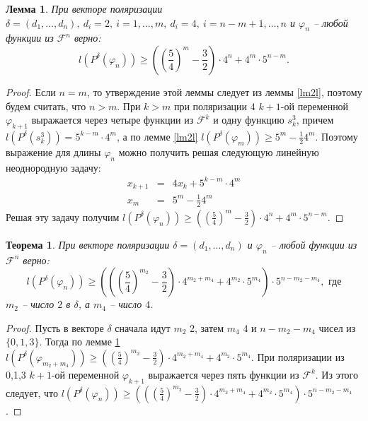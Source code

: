 \documentclass[bibliography=totoc, a4paper, 14pt]{extarticle}
\newtheorem{myth}{Теорема}
\newtheorem{mylm}{Лемма}
\newtheorem*{myco}{Следствие}
\newcommand{\pphi}[1] {P^{\delta}(\varphi_{#1})}
\begin{document}
\begin{mylm}
\label{lm24l}
При векторе поляризации $\delta=(d_1,\dots,d_n),\ d_i = 2,\ i=1,\dots,m,\ d_i=4,{\ i=n-m+1,\dots,n}$
и $\varphi_n$ -- любой функции из $\mathcal{F}^n$ верно:
$$l(\pphi{n})\geqslant\left(\left(\frac{5}{4}\right)^m-\frac{3}{2}\right)\cdot4^n+4^m\cdot5^{n-m}.$$
\end{mylm}
\begin{proof}
Если $n=m$, то утверждение этой леммы следует из леммы \ref{lm2l}, поэтому будем считать, что $n>m$.
При $k > m$ при поляризации 4 $k+1$-ой переменной $\varphi_{k+1}$ выражается через четыре функции
из $\mathcal{F}^k$ и одну функцию $s^3_k$, причем $l(P^{\delta}(s^3_k)) = 5^{k-m} \cdot 4^m$, а по
лемме \ref{lm2l} $l(\pphi{m}) \geqslant 5^m - \frac{1}{2}4^m$. Поэтому выражение для длины
$\varphi_n$ можно получить решая следующую линейную неоднородную задачу:
$$ \begin{array}{lcl}
x_{k+1} &=& 4 x_k + 5^{k-m}\cdot 4^m \\
x_m     &=& 5^m - \frac{1}{2}4^m
\end{array} $$
Решая эту задачу получим $l(\pphi{n}) \geqslant \left(\left(\frac{5}{4}\right)^m -
    \frac{3}{2}\right)\cdot 4^n + 4^m \cdot 5^{n-m}$.
\end{proof}

\begin{myth}
При векторе поляризации $\delta=(d_1,\dots,d_n)$ и $\varphi_n$ -- любой функции из
$\mathcal{F}^n$ верно: $$l(\pphi{n}) \geqslant \left(\left(\left(\frac{5}{4}\right)^{m_2}-
\frac{3}{2}\right) \cdot 4^{m_2+m_4}+4^{m_2}\cdot 5^{m_4} \right) \cdot 5^{n-m_2-m_4},\text{ где}$$
$m_2$ -- число $2$ в $\delta$, а $m_4$ -- число $4$.
\end{myth}
\begin{proof}
Пусть в векторе $\delta$ сначала идут $m_2$ 2, затем $m_4$ 4 и $n-m_2-m_4$ чисел из $\{0,1,3\}$.
Тогда по лемме \ref{lm24l} $l(\pphi{m_2+m_4}) \geqslant \left(\left(\frac{5}{4}\right)^{m_2}
- \frac{3}{2}\right)\cdot 4^{m_2+m_4} + 4^{m_2} \cdot 5^{m_4}$. При поляризации из {0,1,3} $k+1$-ой
переменной $\varphi_{k+1}$ выражается через пять функции из $\mathcal{F}^k$. Из этого следует, что
${l(\pphi{n}) \geqslant \left(\left(\left(\frac{5}{4}\right)^{m_2}-\frac{3}{2}\right) \cdot
4^{m_2+m_4}+4^{m_2} \cdot 5^{m_4} \right) \cdot 5^{n-m_2-m_4}}$.
\end{proof}

\end{document}
